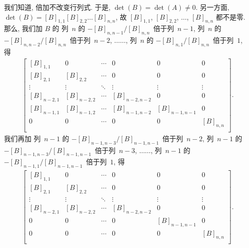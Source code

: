 我们知道, 倍加不改变行列式.
于是, \(\det {(B)} = \det {(A)} \neq 0\).
另一方面, \(\det {(B)} = [B]_{1,1} [B]_{2,2} \dots [B]_{n,n}\),
故 \([B]_{1,1}\), \([B]_{2,2}\), \(\dots\), \([B]_{n,n}\)
都不是零.
那么, 我们加 \(B\) 的%
列~\(n\) 的 \(-[B]_{n,n-1}/[B]_{n,n}\)~倍于列~\(n-1\),
列~\(n\) 的 \(-[B]_{n,n-2}/[B]_{n,n}\)~倍于列~\(n-2\),
\(\dots \dots\),
列~\(n\) 的 \(-[B]_{n,1}/[B]_{n,n}\)~倍于列~\(1\),
得
\begin{align*}
    \begin{bmatrix}
        [B]_{1,1}   & 0           & \cdots & 0             & 0             & 0         \\
        [B]_{2,1}   & [B]_{2,2}   & \cdots & 0             & 0             & 0         \\
        \vdots      & \vdots      & \ddots & \vdots        & \vdots        & \vdots    \\
        [B]_{n-2,1} & [B]_{n-2,2} & \cdots & [B]_{n-2,n-2} & 0             & 0         \\
        [B]_{n-1,1} & [B]_{n-1,2} & \cdots & [B]_{n-1,n-2} & [B]_{n-1,n-1} & 0         \\
        0           & 0           & \cdots & 0             & 0             & [B]_{n,n} \\
    \end{bmatrix}.
\end{align*}
我们再加%
列~\(n-1\) 的 \(-[B]_{n-1,n-3}/[B]_{n-1,n-1}\)~倍于列~\(n-2\),
列~\(n-1\) 的 \(-[B]_{n-1,n-3}/[B]_{n-1,n-1}\)~倍于列~\(n-3\),
\(\dots \dots\),
列~\(n-1\) 的 \(-[B]_{n-1,1}/[B]_{n-1,n-1}\)~倍于列~\(1\),
得
\begin{align*}
    \begin{bmatrix}
        [B]_{1,1}   & 0           & \cdots & 0             & 0             & 0         \\
        [B]_{2,1}   & [B]_{2,2}   & \cdots & 0             & 0             & 0         \\
        \vdots      & \vdots      & \ddots & \vdots        & \vdots        & \vdots    \\
        [B]_{n-2,1} & [B]_{n-2,2} & \cdots & [B]_{n-2,n-2} & 0             & 0         \\
        0           & 0           & \cdots & 0             & [B]_{n-1,n-1} & 0         \\
        0           & 0           & \cdots & 0             & 0             & [B]_{n,n} \\
    \end{bmatrix}.
\end{align*}
